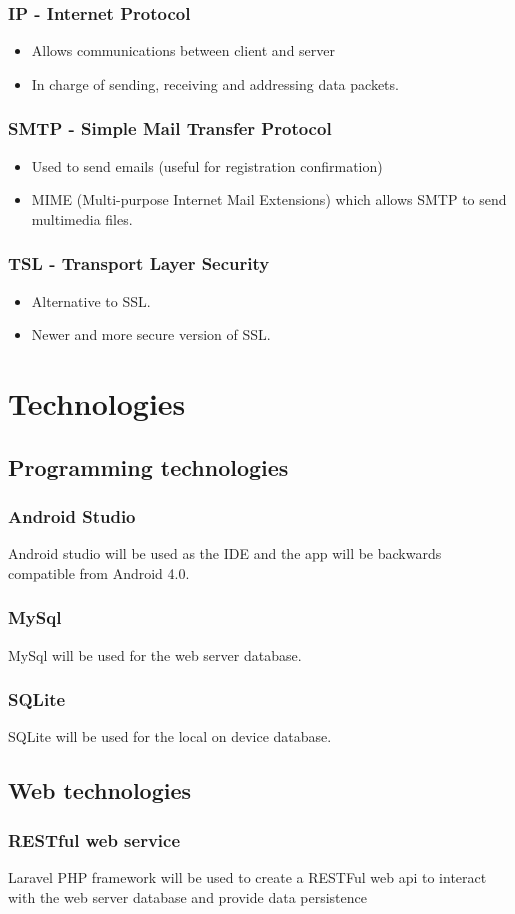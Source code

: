 \documentclass[hidelinks,a4paper,12pt]{article}
\begin{document}
	\subsubsection {IP - Internet Protocol}
	\begin{itemize}
		\item Allows communications between client and server
		\item In charge of sending, receiving and addressing data packets.
	\end{itemize}
	\subsubsection {SMTP - Simple Mail Transfer Protocol}
	\begin{itemize}
		\item Used to send emails (useful for registration confirmation)
		\item MIME (Multi-purpose Internet Mail Extensions) which allows SMTP
to send multimedia files.
	\end{itemize}
	\subsubsection {TSL - Transport Layer Security}
	\begin{itemize}
		\item Alternative to SSL.
		\item Newer and more secure version of SSL.
	\end{itemize}		
		
\section{Technologies}
	\subsection{Programming technologies}
		\subsubsection{Android Studio}
			Android studio will be used as the IDE and the app will be backwards compatible from Android 4.0. 
		\subsubsection{MySql}
			MySql will be used for the web server database.
		\subsubsection{SQLite}
			SQLite will be used for the local on device database.
	\subsection{Web technologies}
		\subsubsection{RESTful web service}
			Laravel PHP framework will be used to create a RESTFul web api to interact with the web server database and provide data persistence
		
\end{document}
